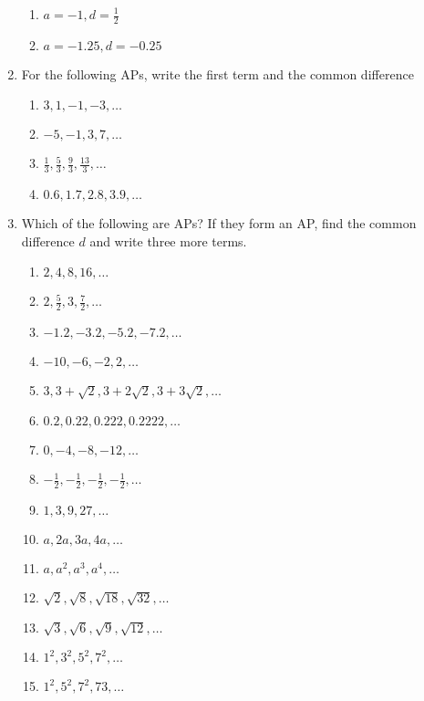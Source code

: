 \begin{enumerate}[label=\thesubsection.\arabic*, ref=\thesubsection.\theenumi]
\begin{multicols}{2}
\begin{enumerate}
\item $ a = -1,  d =\frac{1}{2}$
\item $a = -1.25,  d = -0.25$	
\end{enumerate}
\end{multicols}
\item For the following APs,  write the first term and the common difference
	\begin{multicols}{2}
		\begin{enumerate}[itemsep=1ex]
\item $3,  1,  -1,  -3,  \dots $
\item $-5,  -1,  3,  7,  \dots $
\item $\frac{1}{3},  \frac{5}{3},  \frac{9}{3},  \frac{13}{3}, \dots $
\item $0.6,  1.7,  2.8,  3.9, \dots $ 
\end{enumerate}
\end{multicols}
\item Which of the following are APs? If they form an AP,  find the common difference $d$ and
write three more terms.
\begin{multicols}{2}
\begin{enumerate}[itemsep=1ex]
\item $2,  4,  8,  16,  \dots $
\item $2, \frac{5}{2},  3,  \frac{7}{2}, \dots $
\item $-1.2,  -3.2,  -5.2,  -7.2,  \dots $
\item $-10,  -6,  -2,  2,  \dots $
\item $3, 3+\sqrt{2},  3+2\sqrt{2},  3+3\sqrt{2}, \dots $
\item $0.2,  0.22,  0.222,  0.2222,  \dots $
\item $0,  -4,  -8,  -12,  \dots $
\item $-\frac{1}{2},  -\frac{1}{2},  -\frac{1}{2},  -\frac{1}{2}, \dots $
\item $1,  3,  9,  27, \dots $ 
\item $a,  2a,  3a,  4a, \dots $ 
\item $a,  a^2,  a^3,  a^4, \dots $
\item $\sqrt{2},  \sqrt{8},  \sqrt{18},  \sqrt{32}, \dots $
\item $\sqrt{3},  \sqrt{6},  \sqrt{9},  \sqrt{12}, \dots $
\item $1^2,  3^2,  5^2,  7^2, \dots$
\item $1^2,  5^2,  7^2,  73, \dots $
\end{enumerate}
\end{multicols}

\end{enumerate}
